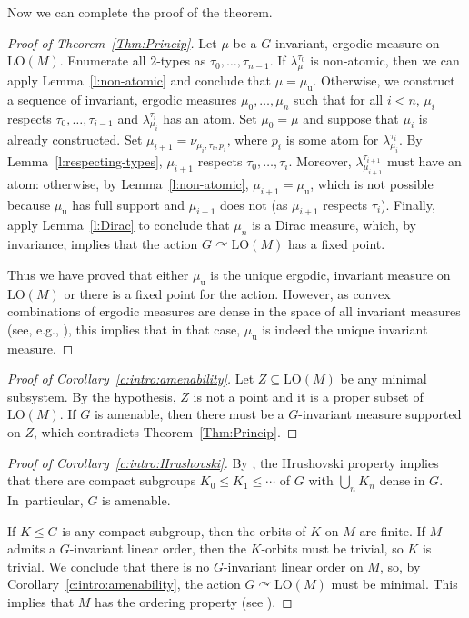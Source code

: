 \documentclass[JEP,XML,SOM,Unicode,published]{cedram}
\let\actson\curvearrowright
\let\sub\subseteq
\theoremstyle{plain}
\theoremstyle{definition}
\newcommand{\LO}{\mathrm{LO}}
\newcommand{\muu}{\mu_{\mathrm{u}}}
\begin{document}
Now we can complete the proof of the theorem.
\begin{proof}[Proof of Theorem~\ref{Thm:Princip}]
Let $\mu$ be a $G$-invariant, ergodic measure on $\LO(M)$. Enumerate all $2$-types as $\tau_0, \ldots, \tau_{n-1}$. If $\lambda^{\tau_0}_\mu$ is non-atomic, then we can apply Lemma~\ref{l:non-atomic} and conclude that $\mu = \muu$. Otherwise, we construct a sequence of invariant, ergodic measures $\mu_0, \ldots, \mu_n$ such that for all $i < n$, $\mu_i$ respects $\tau_0, \ldots, \tau_{i-1}$ and $\lambda^{\tau_i}_{\mu_i}$ has an atom. Set $\mu_0 = \mu$ and suppose that $\mu_i$ is already constructed. Set $\mu_{i+1} = \nu_{\mu_i, \tau_i, p_i}$, where $p_i$ is some atom for $\lambda_{\mu_i}^{\tau_i}$. By Lemma~\ref{l:respecting-types}, $\mu_{i+1}$ respects $\tau_0, \ldots, \tau_i$. Moreover, $\lambda_{\mu_{i+1}}^{\tau_{i+1}}$ must have an atom: otherwise, by Lemma~\ref{l:non-atomic}, $\mu_{i+1} = \muu$, which is not possible because $\muu$ has full support and $\mu_{i+1}$ does not (as $\mu_{i+1}$ respects $\tau_i$). Finally, apply Lemma~\ref{l:Dirac} to conclude that $\mu_n$ is a Dirac measure, which, by invariance, implies that the action $G \actson \LO(M)$ has a fixed point.

Thus we have proved that either $\muu$ is the unique ergodic, invariant measure on $\LO(M)$ or there is a fixed point for the action. However, as convex combinations of ergodic measures are dense in the space of all invariant measures (see, e.g., \cite[\S12]{Phelps2001}), this implies that in that case, $\muu$ is indeed the unique invariant measure.
\end{proof}

\begin{proof}[Proof of Corollary~\ref{c:intro:amenability}]
Let $Z \sub \LO(M)$ be any minimal subsystem. By the hypothesis, $Z$ is not a point and it is a proper subset of $\LO(M)$. If $G$ is amenable, then there must be a $G$-invariant measure supported on $Z$, which contradicts Theorem~\ref{Thm:Princip}.
\end{proof}

\begin{proof}[Proof of Corollary~\ref{c:intro:Hrushovski}]
By \cite[Prop.\,6.4]{Kechris2007a}, the Hrushovski property implies that there are compact subgroups $K_0 \leq K_1 \leq \cdots$ of $G$ with $\bigcup_n K_n$ dense in $G$. In~par\-tic\-ular, $G$ is amenable.

If $K \leq G$ is any compact subgroup, then the orbits of $K$ on $M$ are finite. If $M$ admits a $G$-invariant linear order, then the $K$-orbits must be trivial, so $K$ is trivial. We conclude that there is no $G$-invariant linear order on $M$, so, by Corollary~\ref{c:intro:amenability}, the action $G \actson \LO(M)$ must be minimal. This implies that $M$ has the ordering property (see \cite[Th.\,4]{NguyenVanThe2013}).
\end{proof}
\end{document}
